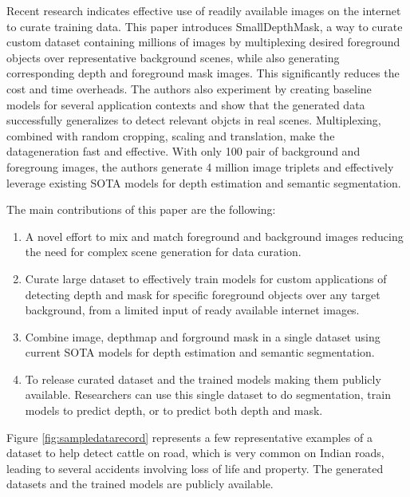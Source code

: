 \documentclass[review]{cvpr}
\begin{document}
Recent research indicates effective use of readily available images on the internet to curate training data.  
This paper introduces SmallDepthMask, 
a way to curate custom dataset containing millions of images by multiplexing desired foreground objects over representative background 
scenes, while also generating corresponding depth and foreground mask images. This significantly reduces the cost and time overheads.
The authors also experiment by creating baseline models for several application contexts and show that the generated data
successfully generalizes to detect relevant objcts in real scenes. Multiplexing, combined with random cropping, scaling 
and translation, make the datageneration fast and effective. With only 100 pair of background and foregroung images, the authors
generate 4 million image triplets and effectively leverage existing SOTA models for depth estimation and semantic segmentation.

The main contributions of this paper are the following:
\begin{enumerate}
\item A novel effort to mix and match foreground and background images reducing the need for complex scene generation for data curation.
\item Curate large dataset to effectively train models for custom applications of detecting depth and mask for specific foreground objects over any target background, from a limited input of ready available internet images.
\item Combine image, depthmap and forground mask in a single dataset using current SOTA models for depth estimation and semantic segmentation.
\item To release curated dataset and the trained models making them publicly available. Researchers can use this single dataset to do segmentation, 
train models to predict depth, or to predict both depth and mask.
\end{enumerate}
  

Figure \ref{fig:sampledatarecord} represents a few representative examples of a dataset to help detect cattle on road,
 which is very common on Indian roads, leading to several accidents involving loss of life and property. 
 The generated datasets and the trained models are publicly available.


\end{document}
